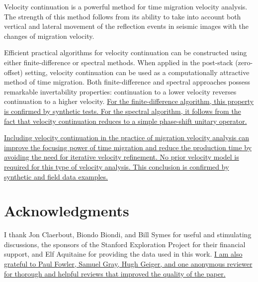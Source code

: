 Velocity continuation is a powerful method for time migration velocity
analysis.  The strength of this method follows from its ability to take into
account both vertical and lateral movement of the reflection events in seismic
images with the changes of migration velocity.

Efficient practical algorithms for velocity continuation can be constructed
using either finite-difference or spectral methods. When applied in the
post-stack (zero-offset) setting, velocity continuation can be used as a
computationally attractive method of time migration. Both finite-difference
and spectral approaches possess remarkable invertability properties:
continuation to a lower velocity reverses continuation to a higher velocity.
\uline{For the finite-difference algorithm, this property is confirmed by synthetic
tests. For the spectral algorithm, it follows from the fact that velocity
continuation reduces to a simple phase-shift unitary operator.}

\uline{Including velocity continuation in the practice of migration velocity analysis
can improve the focusing power of time migration and reduce the production
time by avoiding the need for iterative velocity refinement. No prior velocity
model is required for this type of velocity analysis. This conclusion is
confirmed by synthetic and field data examples.}

\section{Acknowledgments}

I thank Jon Claerbout, Biondo Biondi, and Bill Symes for useful and
stimulating discussions, the sponsors of the Stanford Exploration Project for
their financial support, and Elf Aquitaine for providing the data used in this
work. \uline{I am also grateful to Paul Fowler, Samuel Gray, Hugh Geiger, and one
anonymous reviewer for thorough and helpful reviews that improved the quality
of the paper.}

\newpage



